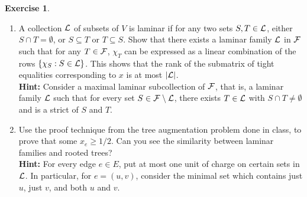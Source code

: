 \documentclass[11pt]{article}
\theoremstyle{definition}
\newtheorem{exercise}{Exercise}
\begin{document}
\begin{exercise}
\begin{enumerate}
\item
A collection $\mathcal{L}$ of subsets of $V$ is laminar if for any two sets $S,T \in \mathcal{L}$, either $S\cap T = \emptyset$, or $S\subseteq T$ or $T\subseteq S$.
Show that there exists a laminar family $\mathcal{L}$ in $\mathcal{F}$ such that for any $T\in \mathcal{F}$, $\chi_T$ can be expressed as a linear combination of 
the rows $\{\chi_S: S\in \mathcal{L}\}$.
This shows that the rank of the submatrix of tight equalities corresponding to $x$ is at most $|\mathcal{L}|$.\\
\noindent
{\bf Hint:}  Consider a maximal laminar subcollection of $\mathcal{F}$, that is, a laminar family $\mathcal{L}$ such that for every set $S\in \mathcal{F}\setminus \mathcal{L}$, there exists $T\in \mathcal{L}$ with 
$S\cap T \neq \emptyset$ and is a  strict  of $S$ and $T$.

\item 
Use the proof technique from the tree augmentation problem done in class, to prove that some $x_e \geq 1/2$.  Can you see the similarity between laminar families and rooted trees? \\
\noindent
{\bf Hint:} For every edge $e\in E$, put at most one unit of charge on certain sets in $\mathcal{L}$. In particular, for $e = (u,v)$, consider the minimal set which contains just $u$, just $v$, and both $u$ and $v$.



\end{enumerate}
\end{exercise}
\end{document}
